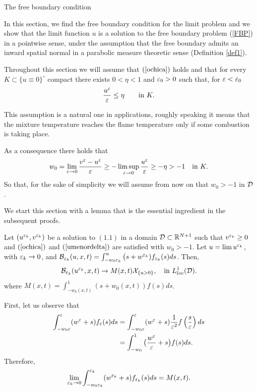 \begin{section}{The free boundary condition}
\setcounter{equation}{0}

In this section, we find the free boundary condition for the limit problem 
and we show that the limit function $u$ is a solution to the free boundary
problem (\ref{FBP}) 
in a pointwise sense, under the assumption that the free boundary admits an 
inward spatial normal in a parabolic measure theoretic sense (Definition 
\ref{def1}). 

Throughout this section we will assume that
$(\ref{ochica})$ holds
and that
for every
$K\subset\{u\equiv0\}^\circ$
compact there exists $0<\eta<1$ and $\varepsilon_0>0$ such that, for $\varepsilon<\varepsilon_0$
\begin{equation}
\label{umenordelta}
\frac{u^\varepsilon}{\varepsilon}\le \eta\qquad\mbox{in }K.
\end{equation}

This assumption is a natural one in applications, roughly speaking it means
that the mixture temperature reaches the flame temperature only if some
combustion is taking place.

As a consequence there holds that
\begin{equation*}
w_0=\lim_{\varepsilon\to0}\frac{v^\varepsilon-u^\varepsilon}{\varepsilon}\ge-\limsup_{\varepsilon\to0}\frac{u^\varepsilon}{\varepsilon}\ge-\eta
>-1\quad\mbox{in }K.
\end{equation*}
So that, for the sake of simplicity we will assume from now on that $w_0>-1$
in ${\cal D}$.

We start this section with a lemma that is the essential ingredient in the 
subsequent proofs.

\begin{lema} 
\label{Bepsilon}
Let $(u^{\varepsilon_k},v^{\varepsilon_k})$ be a solution to $(1.1)$ in a domain ${\cal D}\subset
{\Bbb R}^{N+1}$ such that $v^{\varepsilon_k}\ge0$ and $(\ref{ochica})$ and
$(\ref{umenordelta})$ are satisfied with $w_0>-1$. Let
$u=\lim u^{\varepsilon_k}$, with $\varepsilon_k\to0$, and ${\cal B}_{{\varepsilon_k}}(u,x,t)=\int_{-w_0{\varepsilon_k}}^{u}
\big(s+{w^{\varepsilon_k}})f_{{\varepsilon_k}}(s)ds$. Then,
$$
{{\cal B}}_{\varepsilon_k}(u^{\varepsilon_k},x,t)\to M(x,t){\cal X}_{ \{ u>0 \} },\quad
\mbox{in } L^1_{loc}({\cal D}).
$$
where $M(x,t)=\int_{-w_0(x,t)}^1(s+w_0(x,t))f(s)ds$.
\end{lema}

\begin{pf}
First, let us observe that 
\begin{align*}
\int_{-w_0\varepsilon}^{\varepsilon}(w^{\varepsilon}+s)f_{\varepsilon}(s)ds&=\int_{-w_0\varepsilon}^{\varepsilon}
(w^{\varepsilon}+s)\frac{1}{\varepsilon^2}f\left(\frac{s}{\varepsilon}\right)ds\\
&=\int_{-w_0}^1\big(\frac{w^\varepsilon}{\varepsilon}+s\big)f(s)ds.
\end{align*}
Therefore, 
$$\lim_{{\varepsilon_k}\to0}\int_{-w_0{\varepsilon_k}}^{{\varepsilon_k}}(w^{\varepsilon_k}+s)f_{{\varepsilon_k}}(s)ds=M(x,t).$$


\end{pf}
\end{section}
